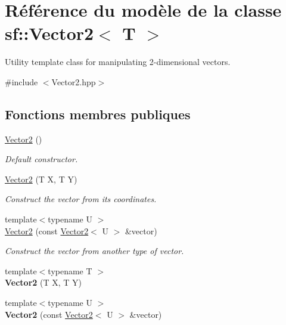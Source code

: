 \hypertarget{classsf_1_1Vector2}{}\section{Référence du modèle de la classe sf\+:\+:Vector2$<$ T $>$}
\label{classsf_1_1Vector2}


Utility template class for manipulating 2-\/dimensional vectors.  




{\ttfamily \#include $<$Vector2.\+hpp$>$}

\subsection*{Fonctions membres publiques}
\begin{DoxyCompactItemize}
\item 
\hyperlink{classsf_1_1Vector2_a58c32383b5291380db4b43a289f75988}{Vector2} ()
\begin{DoxyCompactList}\small\item\em Default constructor. \end{DoxyCompactList}\item 
\hyperlink{classsf_1_1Vector2_aed26a72164e59e8a4a0aeee2049568f1}{Vector2} (T X, T Y)
\begin{DoxyCompactList}\small\item\em Construct the vector from its coordinates. \end{DoxyCompactList}\item 
{\footnotesize template$<$typename U $>$ }\\\hyperlink{classsf_1_1Vector2_a3da455e0ae3f8ff6d2fe36d10b332d10}{Vector2} (const \hyperlink{classsf_1_1Vector2}{Vector2}$<$ U $>$ \&vector)
\begin{DoxyCompactList}\small\item\em Construct the vector from another type of vector. \end{DoxyCompactList}\item 
\mbox{\label{classsf_1_1Vector2_a18a61144d6839c5658b62ebb49c9eb68}} 
{\footnotesize template$<$typename T $>$ }\\{\bfseries Vector2} (T X, T Y)
\item 
\mbox{\label{classsf_1_1Vector2_a3da455e0ae3f8ff6d2fe36d10b332d10}} 
{\footnotesize template$<$typename U $>$ }\\{\bfseries Vector2} (const \hyperlink{classsf_1_1Vector2}{Vector2}$<$ U $>$ \&vector)
\end{DoxyCompactItemize}
